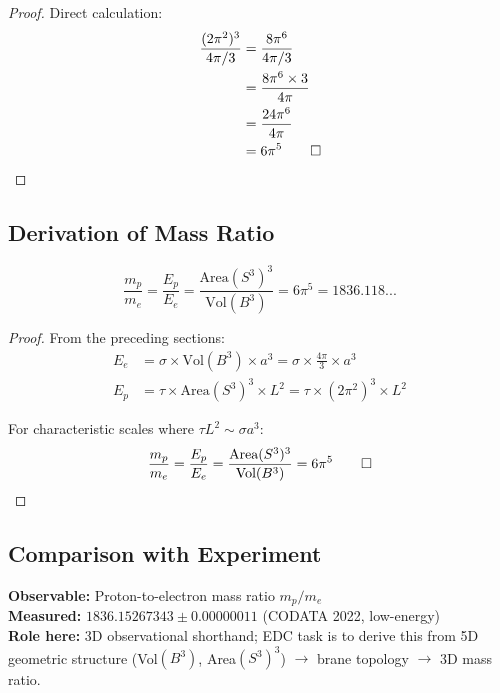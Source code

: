 \begin{proof}
Direct calculation:
\begin{align}
\frac{(2\pi^2)^3}{4\pi/3} &= \frac{8\pi^6}{4\pi/3} \\
&= \frac{8\pi^6 \times 3}{4\pi} \\
&= \frac{24\pi^6}{4\pi} \\
&= 6\pi^5 \qed
\label{eq:ch2_6pi5_calculation}
\end{align}
\end{proof}

\subsection{Derivation of Mass Ratio}

\begin{theorem}
\label{thm:ch2_massratio}
\tagDc{}
\begin{equation}
\frac{m_p}{m_e} = \frac{E_p}{E_e} = \frac{\text{Area}(S^3)^3}{\text{Vol}(B^3)} = 6\pi^5 = 1836.118...
\label{eq:ch2_mass_ratio}
\end{equation}
\end{theorem}

\begin{proof}
From the preceding sections:
\begin{align}
E_e &= \sigma \times \text{Vol}(B^3) \times a^3 = \sigma \times \frac{4\pi}{3} \times a^3 \\
E_p &= \tau \times \text{Area}(S^3)^3 \times L^2 = \tau \times (2\pi^2)^3 \times L^2
\label{eq:ch2_energies}
\end{align}

For characteristic scales where $\tau L^2 \sim \sigma a^3$:
\begin{equation}
\frac{m_p}{m_e} = \frac{E_p}{E_e} = \frac{\text{Area}(S^3)^3}{\text{Vol}(B^3)} = 6\pi^5 \qed
\label{eq:ch2_mass_ratio_derivation}
\end{equation}
\end{proof}

\subsection{Comparison with Experiment}

\begin{tcolorbox}[colback=brown!5!white, colframe=brown!50!black,
    title=\textbf{3D Baseline (empirical)} \tagBL{}]
\textbf{Observable:} Proton-to-electron mass ratio $m_p/m_e$\\
\textbf{Measured:} $1836.15267343 \pm 0.00000011$ (CODATA 2022, low-energy)\\
\textbf{Role here:} 3D observational shorthand; EDC task is to derive this from
5D geometric structure (Vol$(B^3)$, Area$(S^3)^3$) $\to$ brane topology $\to$ 3D mass ratio.
\end{tcolorbox}

